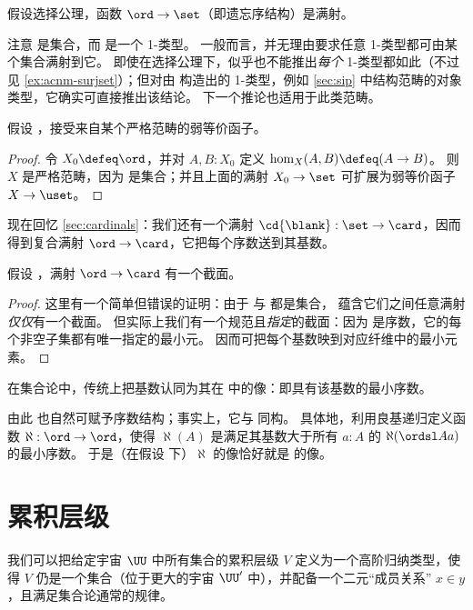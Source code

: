 \begin{cor}
  假设选择公理，函数 $\ord\to\set$（即遗忘序结构）是满射。
\end{cor}

注意 \ord 是集合，而 \set 是一个 1-类型。
一般而言，并无理由要求任意 1-类型都可由某个集合满射到它。
即使在选择公理下，似乎也不能推出\emph{每个} 1-类型都如此（不过见 \cref{ex:acnm-surjset}）；但对由 \set 构造出的 1-类型，例如 \cref{sec:sip} 中结构范畴的对象类型，它确实可直接推出该结论。
下一个推论也适用于此类范畴。

\begin{cor}
  假设 \choice{}，\uset 接受来自某个严格范畴的弱等价函子。
\end{cor}
\begin{proof}
  令 $X_0\defeq \ord$，并对 $A,B:X_0$ 定义 $\hom_X(A,B) \defeq (A\to B)$。
  则 $X$ 是严格范畴，因为 \ord 是集合；并且上面的满射 $X_0 \to \set$ 可扩展为弱等价函子 $X\to \uset$。
\end{proof}

现在回忆 \cref{sec:cardinals}：我们还有一个满射 $\cd{\blank}:\set\to\card$，因而得到复合满射 $\ord\to\card$，它把每个序数送到其基数。

\begin{thm}
  假设 \choice{}，满射 $\ord\to\card$ 有一个截面。
\end{thm}
\begin{proof}
  这里有一个简单但错误的证明：由于 \ord 与 \card 都是集合，\choice{} 蕴含它们之间任意满射\emph{仅仅}有一个截面。
  但实际上我们有一个规范且\emph{指定}的截面：因为 \ord 是序数，它的每个非空子集都有唯一指定的最小元。
  因而可把每个基数映到对应纤维中的最小元素。
\end{proof}

在集合论中，传统上把基数认同为其在 \ord 中的像：即具有该基数的最小序数。

由此 \card 也自然可赋予序数结构；事实上，它与 \ord 同构。
具体地，利用良基递归定义函数 $\aleph:\ord\to\ord$，使得 $\aleph(A)$ 是满足其基数大于所有 $a:A$ 的 $\aleph({\ordsl A a})$ 的最小序数。
于是（在假设 \choice{} 下）$\aleph$ 的像恰好就是 \card 的像。

%

%
\section{累积层级}
\label{sec:cumulative-hierarchy}

%
我们可以把给定宇宙 $\UU$ 中所有集合的累积层级 $V$ 定义为一个高阶归纳类型，使得 $V$ 仍是一个集合（位于更大的宇宙 $\UU'$ 中），并配备一个二元“成员关系” $x\in y$，且满足集合论通常的规律。


